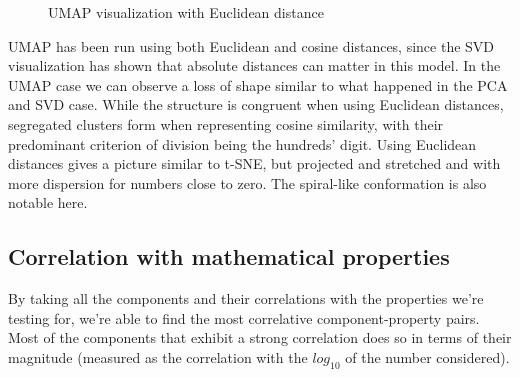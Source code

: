 \documentclass[
  a4paper, twoside, 10pt, titlepage]{book}
\makeatletter
\newcommand*\pandocbounded[1]{%
  \sbox\pandoc@box{#1}%
  \Gscale@div\@tempa{\textheight}{\dimexpr\ht\pandoc@box+\dp\pandoc@box\relax}%
  \Gscale@div\@tempb{\linewidth}{\wd\pandoc@box}%
  \ifdim\@tempb\p@<\@tempa\p@\let\@tempa\@tempb\fi%
  \ifdim\@tempa\p@<\p@\scalebox{\@tempa}{\usebox\pandoc@box}%
  \else\usebox{\pandoc@box}%
  \fi%
}
\makeatother
\begin{document}
\begin{figure}
\centering
\pandocbounded{}
\caption{UMAP visualization with Euclidean
distance}\label{fig-olmo-umap-euclidean}
\end{figure}

UMAP has been run using both Euclidean and cosine distances, since the
SVD visualization has shown that absolute distances can matter in this
model. In the UMAP case we can observe a loss of shape similar to what
happened in the PCA and SVD case. While the structure is congruent when
using Euclidean distances, segregated clusters form when representing
cosine similarity, with their predominant criterion of division being
the hundreds' digit. Using Euclidean distances gives a picture similar
to t-SNE, but projected and stretched and with more dispersion for
numbers close to zero. The spiral-like conformation is also notable
here.

\subsection{Correlation with mathematical
properties}\label{correlation-with-mathematical-properties}

By taking all the components and their correlations with the properties
we're testing for, we're able to find the most correlative
component-property pairs. Most of the components that exhibit a strong
correlation does so in terms of their magnitude (measured as the
correlation with the \(log_{10}\) of the number considered).
\end{document}
